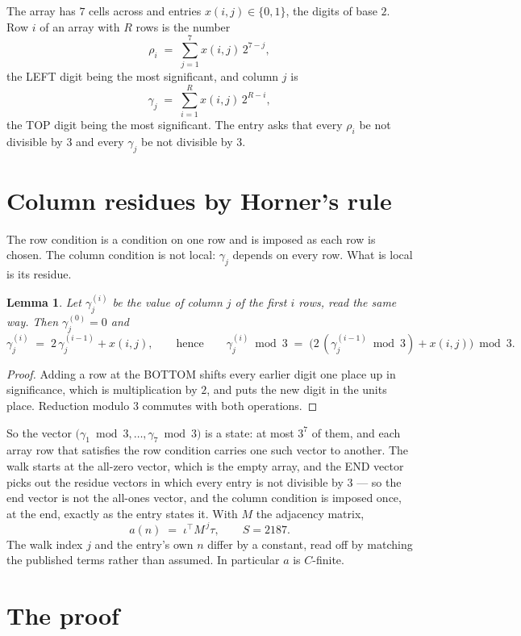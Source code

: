 \documentclass[11pt,a4paper]{article}
\theoremstyle{plain}
\newtheorem{lemma}[theorem]{Lemma}
\theoremstyle{definition}
\begin{document}
The array has $7$ cells across and entries $x(i,j)\in\{0,1\}$, the digits of
base $2$. Row $i$ of an array with $R$ rows is the number
\[
\rho_i\;=\;\sum_{j=1}^{7}x(i,j)\,2^{7-j} ,
\]
the LEFT digit being the most significant, and column $j$ is
\[
\gamma_j\;=\;\sum_{i=1}^{R}x(i,j)\,2^{R-i} ,
\]
the TOP digit being the most significant. The entry asks that every $\rho_i$ be not divisible by
$3$ and every $\gamma_j$ be not divisible by $3$.


\section{Column residues by Horner's rule}

The row condition is a condition on one row and is imposed as each row is chosen. The column
condition is not local: $\gamma_j$ depends on every row. What is local is its residue.

\begin{lemma}\label{lem:horner}
Let $\gamma_j^{(i)}$ be the value of column $j$ of the first $i$ rows, read the same way.
Then $\gamma_j^{(0)}=0$ and
\[
\gamma_j^{(i)}\;=\;2\,\gamma_j^{(i-1)}+x(i,j),
\qquad\text{hence}\qquad
\gamma_j^{(i)}\bmod 3\;=\;
\bigl(2\,(\gamma_j^{(i-1)}\bmod 3)+x(i,j)\bigr)\bmod 3 .
\]
\end{lemma}

\begin{proof}
Adding a row at the BOTTOM shifts every earlier digit one place up in significance, which is
multiplication by $2$, and puts the new digit in the units place. Reduction modulo
$3$ commutes with both operations.
\end{proof}

So the vector $\bigl(\gamma_1\bmod 3,\dots,\gamma_{7}\bmod
3\bigr)$ is a state: at most $3^{7}$ of them, and each array row
that satisfies the row condition carries one such vector to another. The walk starts at the
all-zero vector, which is the empty array, and the END vector picks out the residue vectors in
which every entry is not divisible by $3$ --- so the end vector is not the all-ones
vector, and the column condition is imposed once, at the end, exactly as the entry states it.
With $M$ the adjacency matrix,
\[
a(n)\;=\;\iota^{\!\top}M^{\,j}\tau ,\qquad S=2187.
\]
The walk index $j$ and the entry's own $n$ differ by a constant, read off by matching the
published terms rather than assumed. In particular $a$ is $C$-finite.

\section{The proof}
\end{document}
